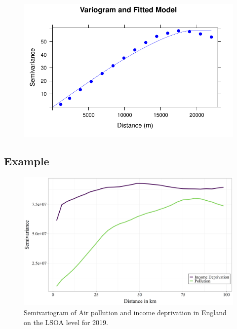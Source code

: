 \documentclass[
  letterpaper,
]{scrbook}
\begin{document}
\begin{figure}[H]

{\centering \includegraphics{04_dependence_files/figure-pdf/unnamed-chunk-12-1.pdf}

}

\end{figure}

\hypertarget{example}{%
\subsection{Example}\label{example}}

\begin{figure}

{\centering \includegraphics{fig/Semivariogram_2019.png}

}

\caption{Semivariogram of Air pollution and income deprivation in
England on the LSOA level for 2019.}

\end{figure}
\end{document}

